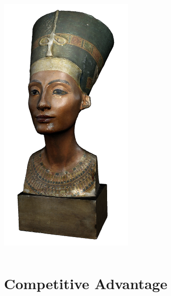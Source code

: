 \begin{frame}
\begin{columns}
\begin{column}{0.2\textwidth}
      \includegraphics[width=.9\textwidth]{images/nefertiti}
    \end{column}
  \end{columns}
\end{frame}

\section{Competitive Advantage}

